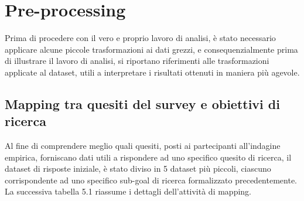     \section{Pre-processing}
    Prima di procedere con il vero e proprio lavoro di analisi, è stato necessario applicare alcune piccole trasformazioni ai dati grezzi, e consequenzialmente prima di illustrare il lavoro di analisi, si riportano riferimenti alle trasformazioni applicate al dataset, utili a interpretare i risultati ottenuti in maniera più agevole.
    
    \subsection{Mapping tra quesiti del survey e obiettivi di ricerca}
    
    Al fine di comprendere meglio quali quesiti, posti ai partecipanti all'indagine empirica, forniscano dati utili a rispondere ad uno specifico quesito di ricerca, il dataset di risposte iniziale, è stato diviso in 5 dataset più piccoli, ciascuno corrispondente ad uno specifico sub-goal di ricerca formalizzato precedentemente. La successiva tabella 5.1 riassume i dettagli dell'attività di mapping.
    
